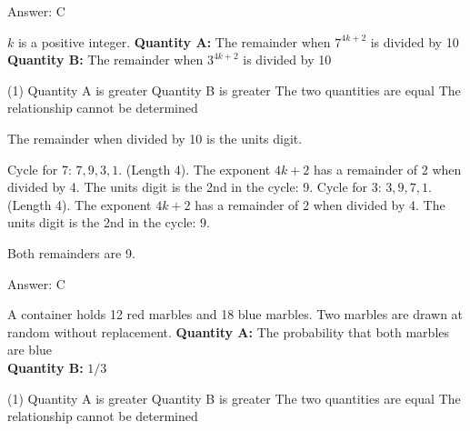\documentclass[11pt,paper=a4,answers]{exam}
\begin{document}
\begin{questions}
\begin{solution}
Answer: \colorbox{yellow!100}{C}
\end{solution}

\vspace{1cm}

\question
$k$ is a positive integer.
\vspace{5pt}
\textbf{Quantity A: } The remainder when $7^{4k+2}$ is divided by 10 \\
\vspace{5pt}
\textbf{Quantity B: } The remainder when $3^{4k+2}$ is divided by 10

\begin{tasks}(1)
\task[A)] Quantity A is greater
\task[B)] Quantity B is greater
\task[C)] The two quantities are equal
\task[D)] The relationship cannot be determined
\end{tasks}

\begin{solution}
The remainder when divided by 10 is the units digit. 
\vspace{5pt}
\begin{center}
Cycle for 7: $7, 9, 3, 1$. (Length 4).
\vspace{5pt}
The exponent $4k+2$ has a remainder of 2 when divided by 4.
\vspace{5pt}
The units digit is the 2nd in the cycle: 9.
\vspace{10pt}
Cycle for 3: $3, 9, 7, 1$. (Length 4).
\vspace{5pt}
The exponent $4k+2$ has a remainder of 2 when divided by 4.
\vspace{5pt}
The units digit is the 2nd in the cycle: 9.
\end{center}
\vspace{5pt}
Both remainders are 9.

Answer: \colorbox{yellow!100}{C}
\end{solution}

\vspace{1cm}

\question
A container holds 12 red marbles and 18 blue marbles. Two marbles are drawn at random without replacement.
\vspace{5pt}
\textbf{Quantity A: } The probability that both marbles are blue \\
\vspace{5pt}
\textbf{Quantity B: } $1/3$

\begin{tasks}(1)
\task[A)] Quantity A is greater
\task[B)] Quantity B is greater
\task[C)] The two quantities are equal
\task[D)] The relationship cannot be determined
\end{tasks}


\end{questions}
\end{document}
